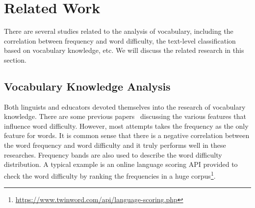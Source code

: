 \section{Related Work}
\label{sec:related}

There are several studies related to the analysis of vocabulary, including the correlation between frequency and word difficulty, the text-level classification based on vocabulary knowledge,  etc.
We will discuss the related research in this section.

\subsection{Vocabulary Knowledge Analysis}

Both linguists and educators devoted themselves into the research of vocabulary knowledge. 
There are some previous papers~\cite{koirala2015word,breland1996word,kirkpatrick1949vocabulary} discussing the various features that influence word difficulty. However, most attempts takes the frequency as the only feature for words. It is common sense that there is a negative correlation between the word frequency and word difficulty and it truly performs well in these researches.
Frequency bands are also used to describe the word difficulty distribution.
A typical example is an online language scoring API provided to check the word difficulty by ranking the frequencies in a huge corpus\footnote{\url{https://www.twinword.com/api/language-scoring.php}}. 

